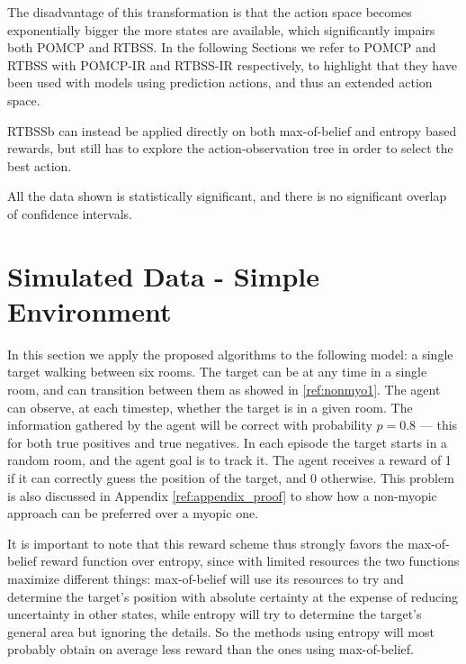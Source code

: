 The disadvantage of this transformation is that the action space becomes exponentially bigger the
more states are available, which significantly impairs both POMCP and RTBSS. In the following Sections we refer to POMCP and RTBSS with POMCP-IR and RTBSS-IR respectively, to highlight that they have been used with models using prediction actions, and thus an extended action space.

RTBSSb can instead be applied directly on both max-of-belief and entropy based rewards, but still
has to explore the action-observation tree in order to select the best action.

All the data shown is statistically significant, and there is no significant overlap of confidence
intervals.

\section{Simulated Data - Simple Environment}

In this section we apply the proposed algorithms to the following model: a single target walking
between six rooms. The target can be at any time in a single room, and can transition between them
as showed in \ref{ref:nonmyo1}. The agent can observe, at each timestep, whether the target is in a
given room. The information gathered by the agent will be correct with probability $p=0.8$ --- this
for both true positives and true negatives. In each episode the target starts in a random room, and
the agent goal is to track it. The agent receives a reward of 1 if it can correctly guess the
position of the target, and 0 otherwise.  This problem is also discussed in Appendix
\ref{ref:appendix_proof} to show how a non-myopic approach can be preferred over a myopic one.

It is important to note that this reward scheme thus strongly favors the max-of-belief reward
function over entropy, since with limited resources the two functions maximize different things: max-of-belief will use its
resources to try and determine the target's position with absolute certainty at the expense of reducing uncertainty in other states, while entropy will try to determine the target's general area but ignoring the
details. So the methods using entropy will most probably obtain on average less reward than the ones
using max-of-belief.
%

